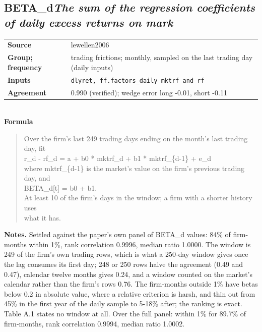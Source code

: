 \documentclass[11pt]{article}
\begin{document}
\subsection*{BETA\_d\quad\normalfont\itshape The sum of the regression coefficients of daily excess returns on mark}
\begin{tabular}{@{}p{3.3cm}p{12.3cm}@{}}
\textbf{Source} & lewellen2006\\
\textbf{Group; frequency} & trading frictions; monthly, sampled on the last trading day (daily inputs)\\
\textbf{Inputs} & \texttt{dlyret, ff.factors\_daily mktrf and rf}\\
\textbf{Agreement} & 0.990 (verified); wedge error long -0.01, short -0.11\\
\end{tabular}\\[4pt]
\textbf{Formula}
\begin{quote}\small
Over the firm's last 249 trading days ending on the month's last trading day, fit\\
    r\_d - rf\_d = a + b0 * mktrf\_d + b1 * mktrf\_\{d-1\} + e\_d\\
where mktrf\_\{d-1\} is the market's value on the firm's previous trading day, and\\
    BETA\_d[t] = b0 + b1.\\
At least 10 of the firm's days in the window; a firm with a shorter history uses\\
what it has.\\

\end{quote}
\textbf{Notes.} Settled against the paper's own panel of BETA\_d values: 84\% of firm-months within 1\%, rank correlation 0.9996, median ratio 1.0000. The window is 249 of the firm's own trading rows, which is what a 250-day window gives once the lag consumes its first day; 248 or 250 rows halve the agreement (0.49 and 0.47), calendar twelve months gives 0.24, and a window counted on the market's calendar rather than the firm's rows 0.76. The firm-months outside 1\% have betas below 0.2 in absolute value, where a relative criterion is harsh, and thin out from 45\% in the first year of the daily sample to 5-18\% after; the ranking is exact. Table A.1 states no window at all. Over the full panel: within 1\% for 89.7\% of firm-months, rank correlation 0.9994, median ratio 1.0002.
\end{document}
